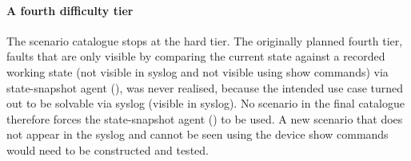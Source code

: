 \paragraph{A fourth difficulty tier} The scenario catalogue stops at the hard tier. The originally planned fourth tier, faults that
are only visible by comparing the current state against a recorded working state (not visible in syslog and not visible using show commands) via state-snapshot agent
(), was never realised, because the intended use case turned out
to be solvable via syslog (visible in syslog). No scenario in the final catalogue therefore forces the
state-snapshot agent () to be used. A new scenario that does not appear in the syslog and cannot be seen using the device show commands would need to be constructed and tested.


